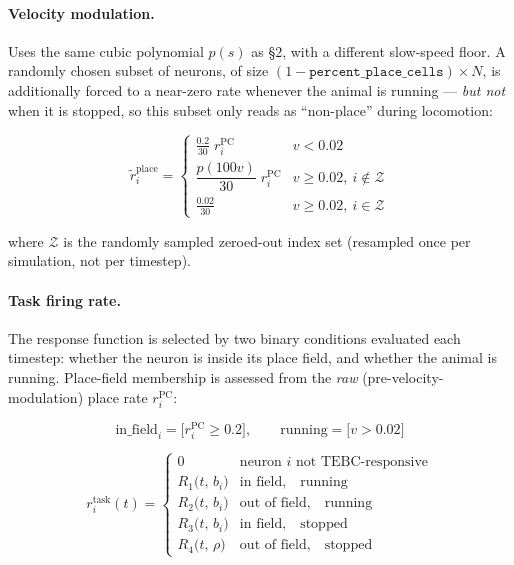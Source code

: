 \documentclass{article}
\begin{document}
\paragraph{Velocity modulation.}
Uses the same cubic polynomial $p(s)$ as \S2, with a different slow-speed floor. A
randomly chosen subset of neurons, of size $(1-\texttt{percent\_place\_cells})\times N$,
is additionally forced to a near-zero rate whenever the animal is running --- \emph{but
not} when it is stopped, so this subset only reads as ``non-place'' during locomotion:

\begin{equation}
    \tilde{r}^{\mathrm{place}}_i =
    \begin{cases}
        \tfrac{0.2}{30}\; r^{\mathrm{PC}}_i & v < 0.02 \\[4pt]
        \dfrac{p(100v)}{30}\; r^{\mathrm{PC}}_i & v \geq 0.02,\ i \notin \mathcal{Z} \\[4pt]
        \tfrac{0.02}{30} & v \geq 0.02,\ i \in \mathcal{Z}
    \end{cases}
\end{equation}

\noindent
where $\mathcal{Z}$ is the randomly sampled zeroed-out index set (resampled once per
simulation, not per timestep).

\paragraph{Task firing rate.}
The response function is selected by two binary conditions evaluated each timestep:
whether the neuron is inside its place field, and whether the animal is running.
Place-field membership is assessed from the \emph{raw} (pre-velocity-modulation)
place rate $r^{\mathrm{PC}}_i$:

\begin{equation}
    \text{in\_field}_i = \bigl[r^{\mathrm{PC}}_i \geq 0.2\bigr], \qquad
    \text{running} = \bigl[v > 0.02\bigr]
\end{equation}

\begin{equation}
    r^{\mathrm{task}}_i(t) =
    \begin{cases}
        0 & \text{neuron } i \text{ not TEBC-responsive} \\[4pt]
        R_1\!\bigl(t,\, b_i\bigr) & \text{in field},\quad \text{running} \\[4pt]
        R_2\!\bigl(t,\, b_i\bigr) & \text{out of field},\quad \text{running} \\[4pt]
        R_3\!\bigl(t,\, b_i\bigr) & \text{in field},\quad \text{stopped} \\[4pt]
        R_4\!\bigl(t,\, \rho\bigr) & \text{out of field},\quad \text{stopped}
    \end{cases}
\end{equation}
\end{document}
